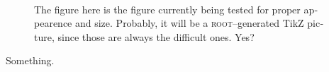 

\begin{english}


\begin{figure}

\centering
\begin{minipage}[b]{.69\textwidth}
\begin{infilsf} \tiny 

\end{infilsf}
\end{minipage}
\hfill\begin{minipage}[b]{.3\textwidth}
\caption{The figure here is the figure currently being tested for
  proper appearence and size. Probably, it will be a \textsc{root}--generated
  TikZ picture, since those are always the difficult ones. Yes?}
\label{fig:my_label}
\end{minipage}

\begin{minipage}[b]{.49\textwidth}\
\begin{infilsf} \tiny 

\end{infilsf}
\end{minipage}
\hfill
\begin{minipage}[b]{.49\textwidth}
\begin{infilsf} \tiny 

\end{infilsf}
\end{minipage}
\end{figure}

Something.

\end{english}
